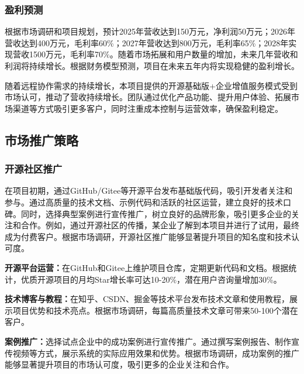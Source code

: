 \documentclass[12pt,a4paper]{article}
\begin{document}
\subsubsection{盈利预测}

根据市场调研和项目规划，预计2025年营收达到150万元，净利润50万元；2026年营收达到400万元，毛利率60\%；2027年营收达到800万元，毛利率65\%；2028年实现营收1500万元，毛利率70\%。随着市场拓展和用户数量的增加，未来几年营收和利润将持续增长。根据财务模型预测，项目在未来五年内将实现稳健的盈利增长。

随着远程协作需求的持续增长，本项目提供的开源基础版+企业增值服务模式受到市场认可，推动了营收持续增长。团队通过优化产品功能、提升用户体验、拓展市场渠道等方式吸引更多客户，同时注重成本控制与运营效率，确保盈利稳定。

\subsection{市场推广策略}

\subsubsection{开源社区推广}

在项目初期，通过GitHub/Gitee等开源平台发布基础版代码，吸引开发者关注和参与。通过高质量的技术文档、示例代码和活跃的社区运营，建立良好的技术口碑。同时，选择典型案例进行宣传推广，树立良好的品牌形象，吸引更多企业的关注和合作。例如，通过开源社区的传播，某企业了解到本项目并进行了试用，最终成为付费客户。根据市场调研，开源社区推广能够显著提升项目的知名度和技术认可度。

\textbf{开源平台运营：}在GitHub和Gitee上维护项目仓库，定期更新代码和文档。根据统计，优质开源项目的月均Star增长率可达10-20\%，潜在用户咨询量增加30\%。

\textbf{技术博客与教程：}在知乎、CSDN、掘金等技术平台发布技术文章和使用教程，展示项目优势和技术亮点。根据市场调研，每篇高质量技术文章可带来50-100个潜在客户。

\textbf{案例推广：}选择试点企业中的成功案例进行宣传推广。通过撰写案例报告、制作宣传视频等方式，展示系统的实际应用效果和优势。根据市场调研，成功案例的推广能够显著提升项目的市场认可度，吸引更多的企业关注和合作。
\end{document}
